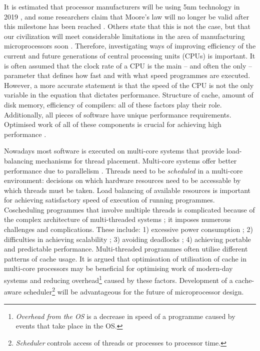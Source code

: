 It is estimated that processor manufacturers will be using 5nm technology in 2019 \cite{Gruener2012,Iwai2009}, and some researchers claim that Moore's law \cite{Moore1998} will no longer be valid after this milestone has been reached \cite{Kish2002}. Others state that this is not the case, but that our civilization will meet considerable limitations in the area of manufacturing microprocessors soon \cite{lundstrom2003moore}. Therefore, investigating ways of improving efficiency of the current and future generations of central processing units (CPUs) is important. It is often assumed that the clock rate of a CPU is the main – and often the only – parameter that defines how fast and with what speed programmes are executed. However, a more accurate statement is that the speed of the CPU is not the only variable in the equation that dictates performance. Structure of cache, amount of disk memory, efficiency of compilers: all of these factors play their role. Additionally, all pieces of software have unique performance requirements. Optimised work of all of these components is crucial for achieving high performance \cite{Henning2000}.

Nowadays most software is executed on multi-core systems that provide load-balancing mechanisms for thread placement. Multi-core systems offer better performance due to parallelism \cite{Pusukuri}. Threads need to be \textit{scheduled} in a multi-core environment: decisions on which hardware resources need to be accessable by which threads must be taken. Load balancing of available resources is important for achieving satisfactory speed of execution of running programmes. Coscheduling programmes that involve multiple threads is complicated because of the complex architecture of multi-threaded systems \cite{Boyd-Wickizer2009,Peter2010}; it imposes numerous challenges and complications. These include: 1) excessive power consumption \cite{Tiwari1998}; 2) difficulties in achieving scalability \cite{Lin2006}; 3) avoiding deadlocks \cite{ousterhout1996threads}; 4) achieving portable and predictable performance. Multi-threaded programmes often utilise different patterns of cache usage. It is argued that optimisation of utilisation of cache in multi-core processors may be beneficial for optimising work of modern-day systems and reducing overhead\footnote{\textit{Overhead from the OS} is a decrease in speed of a programme caused by events that take place in the OS.} caused by these factors. Development of a cache-aware scheduler\footnote{\textit{Scheduler} controls access of threads or processes to processor time.} will be advantageous for the future of microprocessor design.

